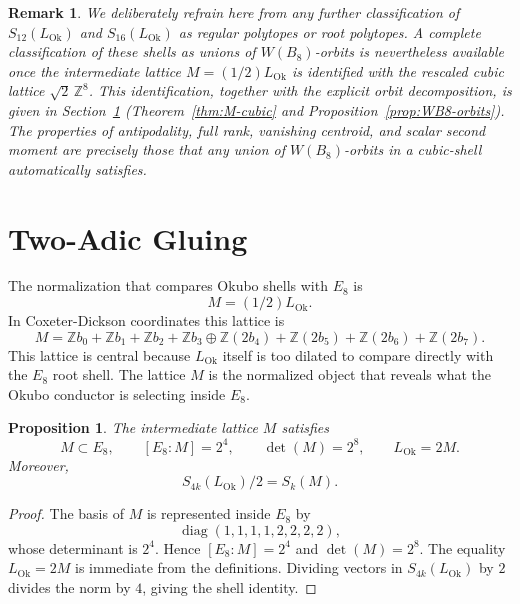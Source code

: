 \documentclass{birkjour}
\newtheorem{proposition}[theorem]{Proposition}
\newtheorem{remark}[theorem]{Remark}
\newcommand{\LOk}{L_{\mathrm{Ok}}}
\newcommand{\ZZ}{\mathbb Z}
\numberwithin{equation}{section}
\begin{document}
\begin{remark}
\label{rem:forward-WB8}
We deliberately refrain here from any further classification of
\(S_{12}(\LOk)\) and \(S_{16}(\LOk)\) as regular polytopes or root polytopes. A complete
classification of these shells as unions of \(W(B_8)\)-orbits is nevertheless
available once the intermediate lattice \(M=(1/2)\LOk\) is identified with the
rescaled cubic lattice \(\sqrt2\,\ZZ^8\). This identification, together with the
explicit orbit decomposition, is given in Section~\ref{sec:two-adic-gluing}
(Theorem~\ref{thm:M-cubic} and Proposition~\ref{prop:WB8-orbits}). The properties of antipodality,
full rank, vanishing centroid, and scalar second moment are precisely those
that any union of \(W(B_8)\)-orbits in a cubic-shell automatically satisfies.
\end{remark}

\section{Two-Adic Gluing}\label{sec:two-adic-gluing}

The normalization that compares Okubo shells with \(E_8\) is
\begin{equation}
M=(1/2)\LOk.
\end{equation}
In Coxeter-Dickson coordinates this lattice is
\begin{equation}
M=\ZZ b_0+\ZZ b_1+\ZZ b_2+\ZZ b_3
\oplus \ZZ(2b_4)+\ZZ(2b_5)+\ZZ(2b_6)+\ZZ(2b_7).
\end{equation}
This lattice is central because \(\LOk\) itself is too dilated to compare
directly with the \(E_8\) root shell. The lattice \(M\) is the normalized
object that reveals what the Okubo conductor is selecting inside \(E_8\).

\begin{proposition}
The intermediate lattice \(M\) satisfies
\begin{equation}
M\subset E_8,\qquad [E_8:M]=2^4,\qquad \det(M)=2^8,\qquad \LOk=2M.
\end{equation}
Moreover,
\begin{equation}
S_{4k}(\LOk)/2=S_k(M).
\end{equation}
\end{proposition}

\begin{proof}
The basis of \(M\) is represented inside \(E_8\) by
\begin{equation}
\operatorname{diag}(1,1,1,1,2,2,2,2),
\end{equation}
whose determinant is \(2^4\). Hence \([E_8:M]=2^4\) and
\(\det(M)=2^8\). The equality \(\LOk=2M\) is immediate from the definitions.
Dividing vectors in \(S_{4k}(\LOk)\) by \(2\) divides the norm by \(4\), giving
the shell identity.
\end{proof}
\end{document}
